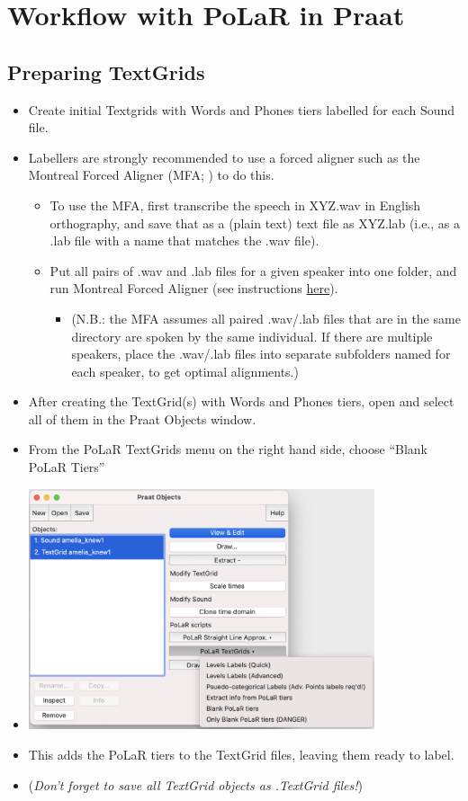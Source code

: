 \documentclass[11pt, twoside]{memoir}
\begin{document}
\section{Workflow with PoLaR in Praat}\label{sec:workflow-with-polar-in-praat}

\subsection{Preparing TextGrids}
	\begin{itemize}
		\item Create initial Textgrids with Words and Phones tiers labelled for each Sound file.
		\item Labellers are strongly recommended to use a forced aligner such as the Montreal Forced Aligner (MFA; \citealt{mcauliffe-19}) to do this.
		\begin{itemize}
			\item To use the MFA, first transcribe the speech in XYZ.wav in English orthography, and save that as a (plain text) text file as XYZ.lab (i.e., as a .lab file with a name that matches the .wav file).
			\item Put all pairs of .wav and .lab files for a given speaker into one folder, and run Montreal Forced Aligner (see instructions \href{https://montreal-forced-aligner.readthedocs.io/en/latest/aligning.html}{here}).
			\begin{itemize}
				\item (N.B.: the MFA assumes all paired .wav\slash .lab files that are in the same directory are spoken by the same individual. If there are multiple speakers, place the .wav\slash .lab files into separate subfolders named for each speaker, to get optimal alignments.)
			\end{itemize}
		\end{itemize}
		\item After creating the TextGrid(s) with Words and Phones tiers, open and select all of them in the Praat Objects window.
		\item From the PoLaR TextGrids menu on the right hand side, choose “Blank PoLaR Tiers”
		\item[] \includegraphics[width=4in]{Practical-Plugin-3-Objects-Window-Textgrids}
		\item This adds the PoLaR tiers to the TextGrid files, leaving them ready to label.
		\item (\textit{Don’t forget to save all TextGrid objects as .TextGrid files!})
	\end{itemize}
\end{document}
